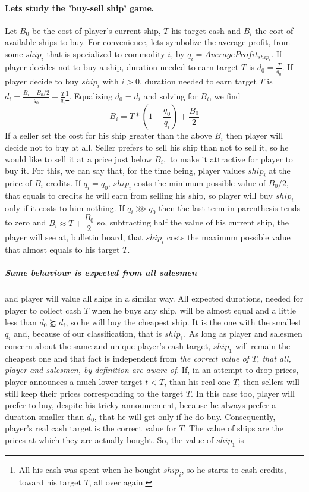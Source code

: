 \documentclass[]{article}
\begin{document}
\paragraph{Lets study the 'buy-sell ship' game.} Let $B_{0}$ be the cost of player's current ship, $T$ his target cash and $B_{i}$ the cost of available ships to buy. For convenience, lets symbolize the average profit, from some $ship_{i}$ that is specialized to commodity $i$, by $q_{i}=AverageProfit_{ship_{i}}.$ 
If player decides not to buy a ship, duration needed to earn target $T$ is $d_{0}=\tfrac{T}{q_{0}}$.
If player decide to buy $ship_{i}$ with $i>0$, duration needed to earn target $T$ is $d_{i}=\tfrac{B_{i}-B_{0}/2}{q_{0}}+\tfrac{T}{q_{i}}$\footnote{All his cash was spent when he bought $ship_{i}$, so he starts to cash credits, toward his target $T$, all over again.}. Equalizing $d_{0}=d_{i}$ and solving for $B_{i}$, we find
\[B_{i}=T*(1-\dfrac{q_{0}}{q_{i}})+\dfrac{B_{0}}{2}\]
If a seller set the cost for his ship greater than the above $B_{i}$ then player will decide not to buy at all. Seller prefers to sell his ship than not to sell it, so he would like to sell it at a price just below $B_{i},$ to make it attractive for player to buy it.  For this, we can say that, for the time being, player values $ship_{i}$ at the price of $B_{i}$ credits. If $q_{i}=q_{0}$, $ship_{i}$ costs the minimum possible value of $B_{0}/2$, that equals to credits he will earn from selling his ship, so player will buy $ship_{i}$ only if it costs to him nothing. If $q_{i}\ggg q_{0}$ then the last term in parenthesis tends to zero and $B_{i}\approx T+\dfrac{B_{0}}{2}$ so, subtracting half the value of his current ship, the player will see at, bulletin board, that $ship_{i}$ costs the maximum possible value that  almost equals to his target $T.$
\subparagraph*{Same behaviour is expected from all salesmen} and player will value all ships in a similar way. All expected durations, needed for player to collect cash $T$ when he buys any ship, will be almost equal and a little less than $d_{0}\succapprox d_{i}$, so he will buy the cheapest ship. It is the one with the smallest $q_{i}$ and, because of our classification, that is $ship_{1}.$ As long as player and salesmen concern about the same and unique player's cash target, $ship_{1}$ will remain the cheapest one and that fact is independent from \emph{the correct value of $T$, that all, player and salesmen, by definition are aware of}. If, in an attempt to drop prices, player announces a much lower target $t<T$, than his real one $T$, then sellers will still keep their prices corresponding to the target  $T$. In this case too, player will prefer to buy, despite his tricky announcement, because he always prefer a duration smaller than $d_{0}$, that he will get only if he do buy. Consequently, player's real cash target is the correct value for $T$. The value of ships are the prices at which they are actually bought. So, the value of $ship_{1}$ is
\end{document}
